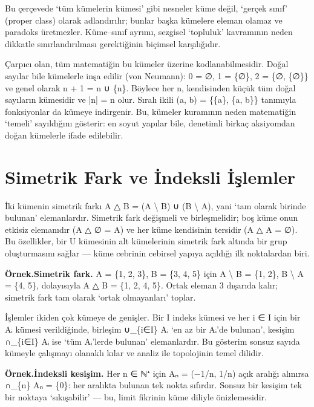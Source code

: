 Bu çerçevede ‘tüm kümelerin kümesi’ gibi nesneler küme değil, ‘gerçek sınıf’ (proper class) olarak adlandırılır; bunlar başka kümelere eleman olamaz ve paradoks üretmezler. Küme–sınıf ayrımı, sezgisel ‘topluluk’ kavramının neden dikkatle sınırlandırılması gerektiğinin biçimsel karşılığıdır.

Çarpıcı olan, tüm matematiğin bu kümeler üzerine kodlanabilmesidir. Doğal sayılar bile kümelerle inşa edilir (von Neumann): 0 = ∅, 1 = \{∅\}, 2 = \{∅, \{∅\}\} ve genel olarak n + 1 = n ∪ \{n\}. Böylece her n, kendisinden küçük tüm doğal sayıların kümesidir ve |n| = n olur. Sıralı ikili (a, b) = \{\{a\}, \{a, b\}\} tanımıyla fonksiyonlar da kümeye indirgenir. Bu, kümeler kuramının neden matematiğin ‘temeli’ sayıldığını gösterir: en soyut yapılar bile, denetimli birkaç aksiyomdan doğan kümelerle ifade edilebilir.

\section{Simetrik Fark ve İndeksli İşlemler}

İki kümenin simetrik farkı A △ B = (A \textbackslash{} B) ∪ (B \textbackslash{} A), yani ‘tam olarak birinde bulunan’ elemanlardır. Simetrik fark değişmeli ve birleşmelidir; boş küme onun etkisiz elemanıdır (A △ ∅ = A) ve her küme kendisinin tersidir (A △ A = ∅). Bu özellikler, bir U kümesinin alt kümelerinin simetrik fark altında bir grup oluşturmasını sağlar — küme cebrinin cebirsel yapıya açıldığı ilk noktalardan biri.

\begin{tcolorbox}[bookbox,colback=cEx]\textbf{\textsf{\textcolor{cAcc}{Örnek.}}}\quad \textbf{Simetrik fark. }A = \{1, 2, 3\}, B = \{3, 4, 5\} için A \textbackslash{} B = \{1, 2\}, B \textbackslash{} A = \{4, 5\}, dolayısıyla A △ B = \{1, 2, 4, 5\}. Ortak eleman 3 dışarıda kalır; simetrik fark tam olarak ‘ortak olmayanları’ toplar.\end{tcolorbox}

İşlemler ikiden çok kümeye de genişler. Bir I indeks kümesi ve her i ∈ I için bir Aᵢ kümesi verildiğinde, birleşim ∪\_\{i∈I\} Aᵢ ‘en az bir Aᵢ’de bulunan’, kesişim ∩\_\{i∈I\} Aᵢ ise ‘tüm Aᵢ’lerde bulunan’ elemanlardır. Bu gösterim sonsuz sayıda kümeyle çalışmayı olanaklı kılar ve analiz ile topolojinin temel dilidir.

\begin{tcolorbox}[bookbox,colback=cEx]\textbf{\textsf{\textcolor{cAcc}{Örnek.}}}\quad \textbf{İndeksli kesişim. }Her n ∈ ℕ⁺ için Aₙ = (−1/n, 1/n) açık aralığı alınırsa ∩\_\{n\} Aₙ = \{0\}: her aralıkta bulunan tek nokta sıfırdır. Sonsuz bir kesişim tek bir noktaya ‘sıkışabilir’ — bu, limit fikrinin küme diliyle önizlemesidir.\end{tcolorbox}

